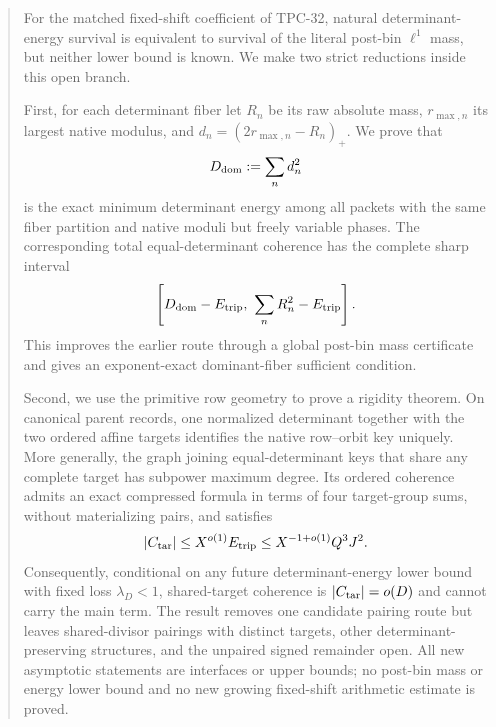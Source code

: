 \begin{abstract}
For the matched fixed-shift coefficient of TPC-32, natural
determinant-energy survival is equivalent to survival of the literal
post-bin \(\ell^1\) mass, but neither lower bound is known.  We make two
strict reductions inside this open branch.

First, for each determinant fiber let \(R_n\) be its raw absolute
mass, \(r_{\max,n}\) its largest native modulus, and
\(d_n=(2r_{\max,n}-R_n)_+\).  We prove that
\[
 D_{\dom}:=\sum_n d_n^2
\]
is the exact minimum determinant energy among all packets with the
same fiber partition and native moduli but freely variable phases.
The corresponding total equal-determinant coherence has the complete
sharp interval
\[
 \left[
 D_{\dom}-E_{\rm trip},\
 \sum_nR_n^2-E_{\rm trip}
 \right].
\]
This improves the earlier route through a global post-bin mass
certificate and gives an exponent-exact dominant-fiber sufficient
condition.

Second, we use the primitive row geometry to prove a rigidity theorem.
On canonical parent records, one normalized determinant together with
the two ordered affine targets identifies the native row--orbit key
uniquely.  More generally, the graph joining equal-determinant keys
that share any complete target has subpower maximum degree.  Its
ordered coherence admits an exact compressed formula in terms of four
target-group sums, without materializing pairs, and satisfies
\[
 |C_{\tar}|
 \le X^{o(1)}E_{\rm trip}
 \le X^{-1+o(1)}Q^3J^2.
\]
Consequently, conditional on any future determinant-energy lower
bound with fixed loss \(\lambda_D<1\), shared-target coherence is
\(\lvert C_{\tar}\rvert=o(D)\) and cannot carry the main term.  The result removes one
candidate pairing route but leaves shared-divisor pairings with
distinct targets, other determinant-preserving structures, and the
unpaired signed remainder open.  All new asymptotic statements are
interfaces or upper bounds; no post-bin mass or energy lower bound and
no new growing fixed-shift arithmetic estimate is proved.
\end{abstract}
